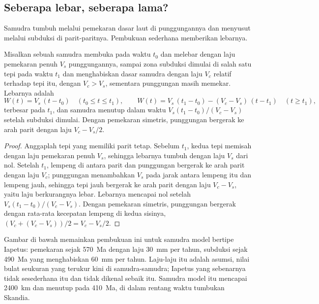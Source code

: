 \subsection{Seberapa lebar, seberapa lama?}

Samudra tumbuh melalui pemekaran dasar laut di punggungannya dan menyusut melalui subduksi di parit-paritnya.
Pembukuan sederhana memberikan lebarnya.

\begin{proposition}\label{prop:b2:wilson-cycle:width}
Misalkan sebuah samudra membuka pada waktu $t_0$ dan melebar dengan laju pemekaran penuh $V_s$ punggungannya, sampai
zona subduksi dimulai di salah satu tepi pada waktu $t_1$ dan menghabiskan dasar samudra dengan laju $V_c$
relatif terhadap tepi itu, dengan $V_c > V_s$, sementara punggungan masih memekar. Lebarnya adalah
\[
  W(t) = V_s\,(t - t_0) \quad (t_0 \le t \le t_1), \qquad
  W(t) = V_s\,(t_1 - t_0) - (V_c - V_s)\,(t - t_1) \quad (t \ge t_1),
\]
terbesar pada $t_1$, dan samudra menutup dalam waktu $V_s(t_1 - t_0)/(V_c - V_s)$ setelah subduksi
dimulai. Dengan pemekaran simetris, punggungan bergerak ke arah parit dengan laju $V_c - V_s/2$.
\end{proposition}

\begin{proof}
Anggaplah tepi yang memiliki parit tetap. Sebelum $t_1$, kedua tepi memisah dengan laju pemekaran
penuh $V_s$, sehingga lebarnya tumbuh dengan laju $V_s$ dari nol. Setelah $t_1$, lempeng di antara
parit dan punggungan bergerak ke arah parit dengan laju $V_c$; punggungan menambahkan $V_s$ pada jarak
antara lempeng itu dan lempeng jauh, sehingga tepi jauh bergerak ke arah parit dengan laju $V_c - V_s$,
yaitu laju berkurangnya lebar. Lebarnya mencapai nol setelah $V_s(t_1 - t_0)/(V_c -
V_s)$. Dengan pemekaran simetris, punggungan bergerak dengan rata-rata kecepatan lempeng di
kedua sisinya, $(V_c + (V_c - V_s))/2 = V_c - V_s/2$.
\end{proof}

Gambar di bawah memainkan pembukuan ini untuk samudra model bertipe Iapetus: pemekaran sejak
\qty{570}{Ma} dengan laju \qty{30}{mm} per tahun, subduksi sejak \qty{490}{Ma} yang menghabiskan \qty{60}{mm} per
tahun. Laju-laju itu adalah asumsi, nilai bulat seukuran yang terukur kini di samudra-samudra;
Iapetus yang sebenarnya tidak sesederhana itu dan tidak dikenal sebaik itu. Samudra model itu mencapai \qty{2400}{km}
dan menutup pada \qty{410}{Ma}, di dalam rentang waktu tumbukan Skandia.

